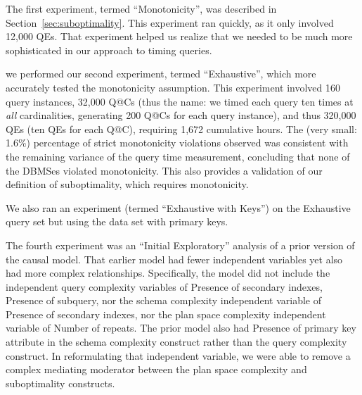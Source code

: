 \documentclass[prodmode,acmtods]{acmsmall}
\makeatletter
\def\QatC{Q{@}C}
\makeatother
\begin{document}
The first experiment, termed ``Monotonicity'', was described in
Section~\ref{sec:suboptimality}. This experiment ran quickly, as it
only involved 12,000 QEs. That experiment helped us realize that we needed
to be much more sophisticated in our approach to timing queries.

 we performed our
second experiment, termed \hbox{``Exhaustive'',} which more accurately tested the 
monotonicity assumption. 
This experiment involved 160 query instances, 32,000 \QatC s (thus the name:
we timed each query ten times at {\em all} cardinalities, generating 200
\QatC s for each query instance), and thus
320,000 QEs (ten QEs for each \QatC ), requiring 1,672 cumulative hours.  The (very small: 1.6\%)
percentage %
of strict monotonicity violations observed was consistent with the remaining
variance of the query time measurement, concluding that none of
the \hbox{DBMSes} violated monotonicity. This also provides a validation of
our definition of suboptimality, which requires monotonicity.

We also ran an experiment (termed ``Exhaustive with Keys'') on the 
\hbox{Exhaustive} query set but using the data set with primary keys.

The fourth experiment was an ``Initial Exploratory'' 
analysis of a prior version of the causal model.
That earlier model had fewer independent
variables yet also had more complex relationships. Specifically, the model
did not include the independent query complexity variables of Presence of
secondary indexes, Presence of subquery, nor the schema complexity
independent variable of Presence of secondary indexes, nor the plan space
complexity independent variable of Number of repeats. The prior model also
had Presence of primary key attribute in the schema complexity construct rather than
the query complexity construct. In reformulating that independent variable,
we were able to remove a complex mediating moderator between the plan
space complexity and suboptimality constructs.
\end{document}
